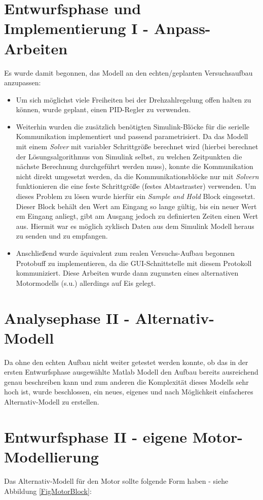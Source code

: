\section{Entwurfsphase und Implementierung I - Anpass-Arbeiten}
Es wurde damit begonnen, das Modell an den echten/geplanten Versuchsaufbau anzupassen:  
\begin{itemize}
	\item Um sich möglichst viele Freiheiten bei der Drehzahlregelung offen halten zu können, wurde geplant, einen PID-Regler zu verwenden. 
	\item Weiterhin wurden die zusätzlich benötigten Simulink-Blöcke für die serielle Kommunikation implementiert und passend parametrisiert. Da das Modell mit einem \textit{Solver} mit variabler Schrittgröße berechnet wird (hierbei berechnet der Lösungsalgorithmus von Simulink selbst, zu welchen Zeitpunkten die nächste Berechnung durchgeführt werden muss), konnte die Kommunikation nicht direkt umgesetzt werden, da die Kommunikationsblöcke nur mit \textit{Solvern} funktionieren die eine feste Schrittgröße (festes Abtastraster) verwenden. 
	Um dieses Problem zu lösen wurde hierfür ein \textit{Sample and Hold} Block eingesetzt. Dieser Block behält den Wert am Eingang so lange gültig, bis ein neuer Wert em Eingang anliegt, gibt am Ausgang jedoch zu definierten Zeiten einen Wert aus. Hiermit war es möglich zyklisch Daten aus dem Simulink Modell heraus zu senden und zu empfangen.
	\item Anschließend wurde äquivalent zum realen Versuchs-Aufbau begonnen Protobuff %
	zu implementieren, da die GUI-Schnittstelle mit diesem Protokoll kommuniziert. Diese Arbeiten wurde dann zugunsten eines alternativen Motormodells (s.u.) allerdings auf Eis gelegt.
\end{itemize}


\section{Analysephase II - Alternativ-Modell}
Da ohne den echten Aufbau nicht weiter getestet werden konnte, ob das in der ersten Entwurfsphase ausgewählte Matlab Modell den Aufbau bereits ausreichend genau beschreiben kann und zum anderen die Komplexität dieses Modells sehr hoch ist, wurde beschlossen, ein neues, eigenes und nach Möglichkeit einfacheres Alternativ-Modell zu erstellen.


\section{Entwurfsphase II - eigene Motor-Modellierung}
Das Alternativ-Modell für den Motor sollte folgende Form haben - siehe Abbildung \ref{FigMotorBlock}:

